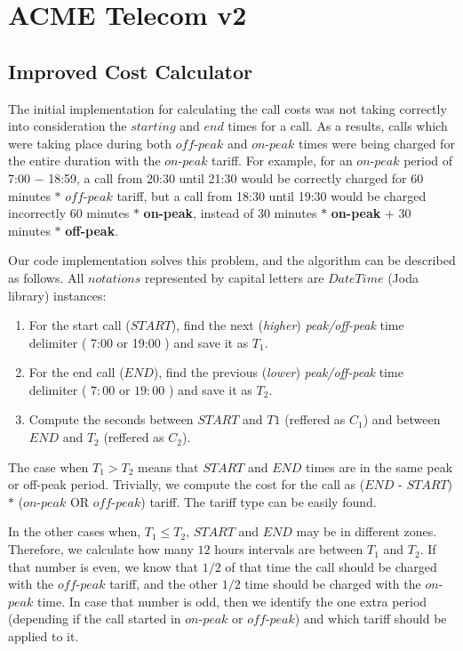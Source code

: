 \documentclass[11pt,twocolumn]{article} %
\begin{document}
\section{ACME Telecom v2}

\subsection{Improved Cost Calculator}

The initial implementation for calculating the call costs was not taking correctly into consideration 
the $starting$ and $end$ times for a call. As a results, calls which were taking place during both $off$-$peak$ and 
$on$-$peak$ times were being charged for the entire duration with the $on$-$peak$ tariff. For example, for an $on$-$peak$
period of 7:00 $-$ 18:59, a call from 20:30 until 21:30 would be correctly charged for 60 minutes $\ast$
$off$-$peak$ tariff, but a call from  18:30 until 19:30 would be charged incorrectly 60 minutes $\ast$ \textbf{on-peak},
instead of 30 minutes $\ast$ \textbf{on-peak} $+$ 30 minutes $\ast$ \textbf{off-peak}.

Our code implementation solves this problem, and the algorithm can be described as follows. All $notations$ represented by capital letters 
are $DateTime$ (Joda library) instances:
\begin{enumerate}
\item{For the start call ($START$), find the next (\textit{higher}) \textit{peak/off-peak} time delimiter ( 7:00 or 19:00 ) and save it as $T_1$.}

\item{For the end call ($END$), find the previous (\textit{lower}) \textit{peak/off-peak} time delimiter ( $7:00$ or $19:00$ ) and save it as $T_2$.}

\item{Compute the seconds between $START$ and $T1$ (reffered as $C_1$) and between $END$ and $T_2$ (reffered as $C_2$).}


\end{enumerate}

The case when $T_1 > T_2$ means that $START$ and $END$ times are in the same peak or off-peak period. Trivially, we compute the 
cost for the call as ($END$ - $START$) $\ast$ ($on$-$peak$ OR $off$-$peak$) tariff. The tariff type can be easily found. 

In the other cases when, $T_1 \leq T_2$, $START$ and $END$ may be in different zones. Therefore, we calculate how many $12$ hours intervals are between $T_1$ and $T_2$.
If that number is even,  we know that $1/2$ of that time the call should be 
charged with the $off$-$peak$ tariff, and the other $1/2$ time should be charged with the $on$-$peak$ time. 
In case that number is odd, then we identify the one extra period (depending if the call started in $on$-$peak$ or $off$-$peak$) and which tariff should be applied to it.
\end{document}
